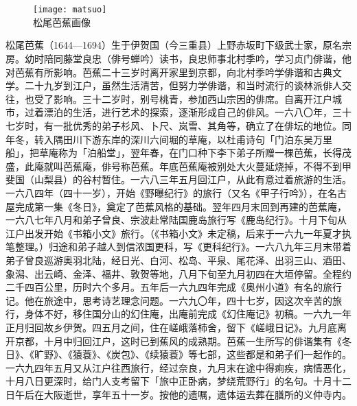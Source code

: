 \chapter[{\FM 松尾芭蕉}]{\FM {}}

\begin{center}
    \begin{figure}
        \centering
        \texttt{[image: matsuo]}\\[1em]
        \large{\FS 松尾芭蕉画像}
    \end{figure}
\end{center}

\newpage

{\FS
    松尾芭蕉（1644—1694）生于伊贺国（今三重县）上野赤坂町下级武士家，原名宗房。幼时陪同藤堂良忠（俳号蝉吟）读书，良忠师事北村季吟，学习贞门俳谐，他对芭蕉有所影响。芭蕉二十三岁时离开家里到京都，向北村季吟学俳谐和古典文学。二十九岁到江户，虽然生活清苦，但努力学俳谐，和当时流行的谈林派俳人交往，也受了影响。三十二岁时，别号桃青，参加西山宗因的俳席。自离开江户城市，过着漂泊的生活，进行艺术的探索，逐渐形成自己的俳风。一六八〇年，三十七岁时，有一批优秀的弟子杉风、卜尺、岚雪、其角等，确立了在俳坛的地位。同年冬，转入隅田川下游东岸的深川六间堀的草庵，以杜甫诗句「门泊东吴万里船」，把草庵称为「泊船堂」，翌年春，在门口种下李下弟子所赠一棵芭蕉，长得茂盛，此庵就叫芭蕉庵，俳号称芭蕉。年底芭蕉庵被别处大火蔓延烧掉，不得不到甲斐国（山梨县）的谷村暂住。一六八三年五月回江户，从此有意过着旅游的生活。一六八四年（四十一岁），开始《野曝纪行》的旅行（又名《甲子行吟》），在名古屋完成第一集《冬日》，奠定了芭蕉风格的基础。翌年四月末回到再建的芭蕉庵，一六八七年八月和弟子曾良、宗波赴常陆国鹿岛旅行写《鹿岛纪行》。十月下旬从江户出发开始《书箱小文》旅行。（《书箱小文》未定稿，后来于一六九一年夏才执笔整理。）归途和弟子越人到信浓国更科，写《更科纪行》。一六八九年三月末带着弟子曾良巡游奥羽北陆，经日光、白河、松岛、平泉、尾花泽、出羽三山、酒田、象潟、出云崎、金泽、福井、敦贺等地，八月下旬至九月初四在大垣停留。全程约二千四百公里，历时六个多月。五年后一六九四年完成《奥州小道》有名的旅行记。他在旅途中，思考诗艺理念问题。一六九〇年，四十七岁，因这次辛苦的旅行，身体不好，移住国分山的幻住庵，出庵前完成《幻住庵记》初稿。一六九一年正月归回故乡伊贺。四五月之间，住在嵯峨落柿舍，留下《嵯峨日记》。九月底离开京都，十月中归回江户，这时已到蕉风的成熟期。芭蕉一生所写的俳谐集有《冬日》、《旷野》、《猿蓑》、《炭包》、《续猿蓑》等七部，这些都是和弟子们一起作的。一六九四年五月又从江户往西旅行，经过奈良，九月末在途中得痢疾，病情恶化，十月八日更深时，给门人支考留下「旅中正卧病，梦绕荒野行」的名句。十月十二日午后在大阪逝世，享年五十一岁。按他的遗嘱，遗体运去葬在膳所的义仲寺内。

}
